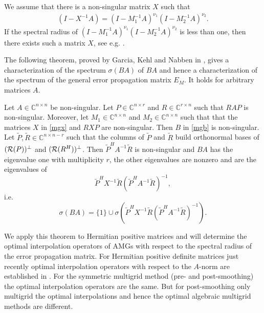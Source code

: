 \documentclass[final]{amsart}
\newcommand{\innCnn}{\in\mathbb{C}^{n\times n}}
\newcommand{\innCrn}{\in\mathbb{C}^{r\times n}}
\newcommand{\innCnr}{\in\mathbb{C}^{n\times r}}
\newcommand{\beqo}{\begin{eqnarray*}}
\newcommand{\beq}{\begin{eqnarray}}
\newcommand{\eeqo}{\end{eqnarray*}}
\newcommand{\eeq}{\end{eqnarray}}
\numberwithin{equation}{section}
\newcommand{\im} {{\cal R}}
\newcommand{\bC}{\mathbb{C}}
\begin{document}

We assume that there is a
non-singular matrix $X$ such that
\beq \label{mgx}
(I-X^{-1}A) = (I-M_1^{-1}A)^{\nu_1}(I-M_2^{-1}A)^{\nu_2}.
\eeq
If the spectral radius of $
(I-M_1^{-1}A)^{\nu_1}(I-M_2^{-1}A)^{\nu_2}$ is less  than one, then  there
exists such a
matrix  $X$, see e.g. \cite{BenS97}.

The following theorem, proved by Garcia, Kehl  and Nabben in \cite{GarKN18},
gives a characterization of the spectrum $\sigma(BA)$ of $BA$ and hence a
characterization of the spectrum of the general error propagation matrix $E_M$.
It holds  for arbitrary matrices $A$.


\begin{theorem} \label{theo:mg:eig}
Let $A \innCnn$ be  non-singular. Let   $P \innCnr $ and  $R \innCrn $ such
that $RAP$ is non-singular. Moreover, let $M_1 \innCnn$ and $M_2 \innCnn $
such  that  that the matrices $X$ in \eqref{mgx} and $RXP$ are  non-singular.
Then $B$ in
\eqref{mgb}  is non-singular. Let $\tilde P, \tilde R \in \bC^{n \times n-r}$
such that the columns  of
$\tilde P$ and $\tilde R $  build  orthonormal  bases of $(\im (P))^\perp$ and
$(\im (R^{H}))^\perp$. Then  $\tilde P^HA^{-1}\tilde R$ is non-singular and
$BA$  has the eigenvalue one  with multiplicity $r$, the other eigenvalues are
nonzero and are   the eigenvalues of 
\[
\tilde P^HX^{-1}\tilde R (\tilde P^HA^{-1}\tilde R)^{-1}, 
\]
i.e.
\[
\sigma(BA) = \{1\} \cup \sigma(\tilde P^HX^{-1}\tilde R (\tilde P^HA^{-1}\tilde
R)^{-1}).
\]
\end{theorem}

We apply this   theorem to  Hermitian positive  matrices and will 
determine the  optimal interpolation operators of AMGs with respect to the
spectral radius of the error propagation matrix.
For Hermitian  positive definite 
matrices just recently optimal interpolation  operators with respect to the
$A$-norm are established in \cite{XuZ17, Bra18}.
For the symmetric multigrid method (pre- and  post-smoothing) the optimal
interpolation operators are  the same. But for post-smoothing only multigrid
the optimal interpolations and hence the optimal algebraic multigrid methods
are  different.
\end{document}
